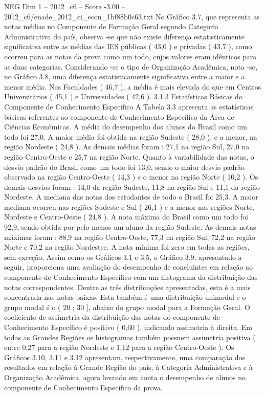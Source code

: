 \begin{textsample}{NEG Dim 1 – 2012\_c6 – Score -3.00 – 2012\_c6/enade\_2012\_ci\_econ\_1bf88b0c63.txt}
No Gráfico 3.7, que representa as notas médias no Componente de Formação Geral segundo Categoria Administrativa do país, observa -se que não existe diferença estatisticamente significativa entre as médias das IES públicas ( 43,0 ) e privadas ( 43,7 ), como ocorreu para as notas da prova como um todo, cujos valores eram idênticos para as duas categorias.
Considerando -se o tipo de Organização Acadêmica, nota -se, no Gráfico 3.8, uma diferença estatisticamente significativa entre a maior e a menor média.
Nas Faculdades ( 46,7 ), a média é mais elevada do que em Centros Universitários ( 45,1 ) e Universidades ( 42,6 ). 3.1.3 Estatísticas Básicas do Componente de Conhecimento Específico A Tabela 3.3 apresenta as estatísticas básicas referentes ao componente de Conhecimento Específico da Área de Ciências Econômicas.
A média do desempenho dos alunos do Brasil como um todo foi 27,0.
A maior média foi obtida na região Sudeste ( 28,0 ), e a menor, na região Nordeste ( 24,8 ).
As demais médias foram : 27,1 na região Sul, 27,0 na região Centro-Oeste e 25,7 na região Norte.
Quanto à variabilidade das notas, o desvio padrão do Brasil como um todo foi 13,0, sendo o maior desvio padrão observado na região Centro-Oeste ( 14,3 ) e o menor na região Norte ( 10,2 ).
Os demais desvios foram : 14,0 da região Sudeste, 11,8 na região Sul e 11,1 da região Nordeste.
A mediana das notas dos estudantes de todo o Brasil foi 25,3.
A maior mediana ocorreu nas regiões Sudeste e Sul ( 26,1 ) e a menor nas regiões Norte, Nordeste e Centro-Oeste ( 24,8 ).
A nota máxima do Brasil como um todo foi 92,9, sendo obtida por pelo menos um aluno da região Sudeste.
As demais notas máximas foram : 88,9 na região Centro-Oeste, 77,3 na região Sul, 72,2 na região Norte e 70,2 na região Nordestee.
A nota mínima foi zero em todas as regiões, sem exceção.
Assim como os Gráficos 3.1 e 3.5, o Gráfico 3.9, apresentado a seguir, proporciona uma avaliação do desempenho de concluintes em relação ao componente de Conhecimento Específico com um histograma da distribuição das notas correspondentes.
Dentre as três distribuições apresentadas, esta é a mais concentrada nas notas baixas.
Esta também é uma distribuição unimodal e o grupo modal é o ( 20 ; 30 ], abaixo do grupo modal para a Formação Geral.
O coeficiente de assimetria da distribuição das notas do componente de Conhecimento Específico é positivo ( 0,60 ), indicando assimetria à direita.
Em todas as Grandes Regiões os histogramas também possuem assimetria positiva ( entre 0,27 para a região Nordeste e 1,12 para a região Centro-Oeste ).
Os Gráficos 3.10, 3.11 e 3.12 apresentam, respectivamente, uma comparação dos resultados em relação à Grande Região do país, à Categoria Administrativa e à Organização Acadêmica, agora levando em conta o desempenho de alunos no componente de Conhecimento Específico da prova.

\end{textsample}
